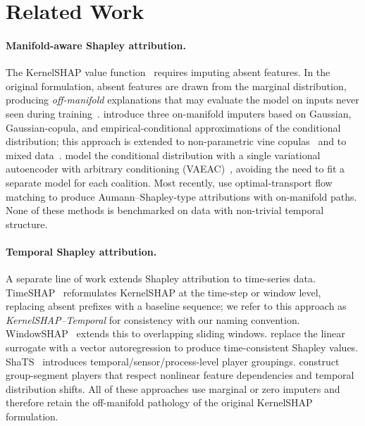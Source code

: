 \section{Related Work}
\label{sec:related}

\paragraph{Manifold-aware Shapley attribution.}
The KernelSHAP value function~\citep{lundberg2017unified} requires
imputing absent features.  In the original formulation, absent features are
drawn from the marginal distribution, producing \emph{off-manifold}
explanations that may evaluate the model on inputs never seen during
training~\citep{frye2021shapley}.  \citet{aas2021explaining} introduce three
on-manifold imputers based on Gaussian, Gaussian-copula, and empirical-conditional
approximations of the conditional distribution; this approach is extended to
non-parametric vine copulas~\citep{aas2021vineexplaining} and to mixed
data~\citep{redelmeier2020explaining}.  \citet{olsen2022using} model the
conditional distribution with a single variational autoencoder with arbitrary
conditioning (VAEAC)~\citep{ivanov2018variational}, avoiding the need to fit
a separate model for each coalition.  Most recently,
\citet{zhang2026axiomatic} use optimal-transport flow matching to produce
Aumann--Shapley-type attributions with on-manifold paths.
None of these methods is benchmarked on data with non-trivial temporal structure.

\paragraph{Temporal Shapley attribution.}
A separate line of work extends Shapley attribution to time-series data.
TimeSHAP~\citep{bento2021timeshap} reformulates KernelSHAP at the
time-step or window level, replacing absent prefixes with a baseline
sequence; we refer to this approach as \emph{KernelSHAP--Temporal} for
consistency with our naming convention.  WindowSHAP~\citep{nayebi2023windowshap}
extends this to overlapping sliding windows.
\citet{villani2022feature} replace the linear surrogate with a vector autoregression
to produce time-consistent Shapley values.  ShaTS~\citep{de2025shats}
introduces temporal/sensor/process-level player groupings.
\citet{kim2026groupsegment} construct group-segment players that respect
nonlinear feature dependencies and temporal distribution shifts.
All of these approaches use marginal or zero imputers and therefore retain the
off-manifold pathology of the original KernelSHAP formulation.

